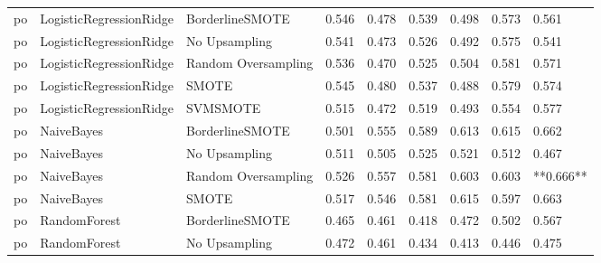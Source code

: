 \begin{tabular}{lllllllll}
      po &      LogisticRegressionRidge &     BorderlineSMOTE & 0.546 &                     0.478 &                 0.539 &                  0.498 &                                   0.573 &     0.561 \\
      po &      LogisticRegressionRidge &       No Upsampling & 0.541 &                     0.473 &                 0.526 &                  0.492 &                                   0.575 &     0.541 \\
      po &      LogisticRegressionRidge & Random Oversampling & 0.536 &                     0.470 &                 0.525 &                  0.504 &                                   0.581 &     0.571 \\
      po &      LogisticRegressionRidge &               SMOTE & 0.545 &                     0.480 &                 0.537 &                  0.488 &                                   0.579 &     0.574 \\
      po &      LogisticRegressionRidge &            SVMSMOTE & 0.515 &                     0.472 &                 0.519 &                  0.493 &                                   0.554 &     0.577 \\
      po &                   NaiveBayes &     BorderlineSMOTE & 0.501 &                     0.555 &                 0.589 &                  0.613 &                                   0.615 &     0.662 \\
      po &                   NaiveBayes &       No Upsampling & 0.511 &                     0.505 &                 0.525 &                  0.521 &                                   0.512 &     0.467 \\
      po &                   NaiveBayes & Random Oversampling & 0.526 &                     0.557 &                 0.581 &                  0.603 &                                   0.603 & **0.666** \\
      po &                   NaiveBayes &               SMOTE & 0.517 &                     0.546 &                 0.581 &                  0.615 &                                   0.597 &     0.663 \\
      po &                 RandomForest &     BorderlineSMOTE & 0.465 &                     0.461 &                 0.418 &                  0.472 &                                   0.502 &     0.567 \\
      po &                 RandomForest &       No Upsampling & 0.472 &                     0.461 &                 0.434 &                  0.413 &                                   0.446 &     0.475 \\

\end{tabular}
